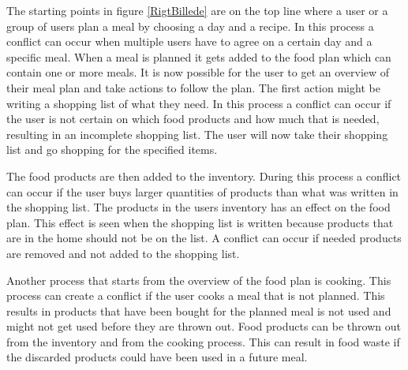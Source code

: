 The starting points in figure \ref{RigtBillede} are on the top line where a user or a group of users plan a meal by choosing a day and a recipe. In this process a conflict can occur when multiple users have to agree on a certain day and a specific meal. When a meal is planned it gets added to the food plan which can contain one or more meals. It is now possible for the user to get an overview of their meal plan and take actions to follow the plan. The first action might be writing a shopping list of what they need. In this process a conflict can occur if the user is not certain on which food products and how much that is needed, resulting in an incomplete shopping list. The user will now take their shopping list and go shopping for the specified items. 

The food products are then added to the inventory. During this process a conflict can occur if the user buys larger quantities of products than what was written in the shopping list. The products in the users inventory has an effect on the food plan. This effect is seen when the shopping list is written because products that are in the home should not be on the list. A conflict can occur if needed products are removed and not added to the shopping list. 

Another process that starts from the overview of the food plan is cooking. This process can create a conflict if the user cooks a meal that is not planned. This results in products that have been bought for the planned meal is not used and might not get used before they are thrown out. Food products can be thrown out from the inventory and from the cooking process. This can result in food waste if the discarded products could have been used in a future meal.      
   


      